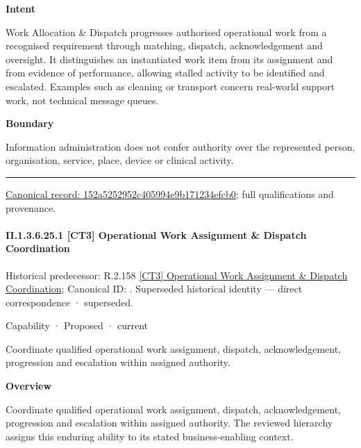 \textbf{Intent}



Work Allocation \& Dispatch progresses authorised operational work from a recognised requirement through matching, dispatch, acknowledgement and oversight. It distinguishes an instantiated work item from its assignment and from evidence of performance, allowing stalled activity to be identified and escalated. Examples such as cleaning or transport concern real-world support work, not technical message queues.



\textbf{Boundary}



Information administration does not confer authority over the represented person, organisation, service, place, device or clinical activity.



\medskip\hrule\medskip

{\footnotesize \href{../../../../../../../continuum/strategy/capability/152a5252952c405994e9b171234efcb0.md}{Canonical record: 152a5252952c405994e9b171234efcb0}; full qualifications and provenance.}\par
\paragraph*{II.1.3.6.25.1 [CT3] Operational Work Assignment \& Dispatch Coordination}
\label{navigation:II.1.3.6.25.1}

{\small Historical predecessor: R.2.158 \hyperref[element:b42afda9e876463ba56fa8f73fe7a32a]{[CT3] Operational Work Assignment \& Dispatch Coordination}; Canonical ID: \texttt{}. Superseded historical identity — direct correspondence · superseded.}\par
\label{element:3b58935cfa974176989c3c75d76a00fe}
{\small Capability · Proposed · current}\par

Coordinate qualified operational work assignment, dispatch, acknowledgement, progression and escalation within assigned authority.



\textbf{Overview}



Coordinate qualified operational work assignment, dispatch, acknowledgement, progression and escalation within assigned authority. The reviewed hierarchy assigns this enduring ability to its stated business-enabling context.



